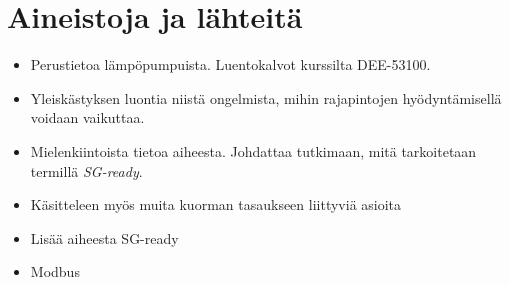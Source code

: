 \section{Aineistoja ja lähteitä}
  \begin{itemize}
    \item Perustietoa lämpöpumpuista. Luentokalvot kurssilta DEE-53100. \parencite{kummu}
    \item Yleiskästyksen luontia niistä ongelmista, mihin rajapintojen hyödyntämisellä voidaan vaikuttaa. \parencite[Luku 3]{rautiainen}
    \item Mielenkiintoista tietoa aiheesta. Johdattaa tutkimaan, mitä tarkoitetaan termillä \emph{SG-ready}. \parencite{ModelBasedFlexibilityAssessment}
    \item Käsitteleen myös muita kuorman tasaukseen liittyviä asioita \parencite{ShenJiangLi}
    \item Lisää aiheesta SG-ready \parencite{fischerTriebelSelinger}
    \item Modbus \parencite{sousaPortugal}
  \end{itemize}
